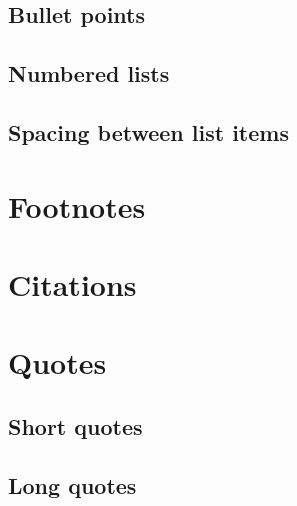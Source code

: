 \documentclass[
  letterpaper,
  DIV=11,
  numbers=noendperiod]{scrreprt}
\begin{document}

\subsection*{Bullet points}\label{bullet-points}

\subsection*{Numbered lists}\label{numbered-lists}

\subsection*{Spacing between list
items}\label{spacing-between-list-items}

\section*{Footnotes}\label{footnotes}


\section*{Citations}\label{citations}


\section*{Quotes}\label{quotes}


\subsection*{Short quotes}\label{short-quotes}

\subsection*{Long quotes}\label{long-quotes}
\end{document}
